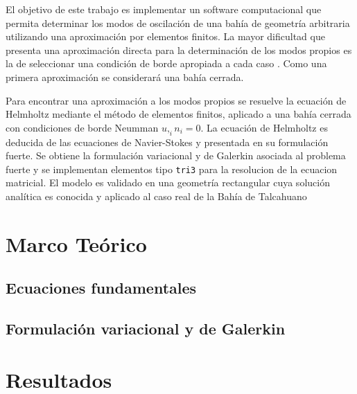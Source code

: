 \documentclass[12pt, letterpaper]{article}
\begin{document}
El objetivo de este trabajo es implementar un software computacional que permita determinar los modos de oscilaci\'on de una bah\'ia de geometr\'ia arbitraria utilizando una aproximaci\'on por elementos finitos. La mayor dificultad que presenta una aproximaci\'on directa para la determinaci\'on de los modos propios es la de seleccionar una condici\'on de borde apropiada a cada caso \cite{Mei2005, Rabino2009}. Como una primera aproximaci\'on se considerar\'a una bah\'ia cerrada.

Para encontrar una aproximaci\'on a los modos propios se resuelve la ecuaci\'on de Helmholtz mediante el m\'etodo de elementos finitos, aplicado a una bah\'ia cerrada con condiciones de borde Neumman $u,_i  n_i = 0$. La ecuaci\'on de Helmholtz es deducida de las ecuaciones de Navier-Stokes y presentada en su formulaci\'on fuerte. Se obtiene la formulaci\'on variacional y de Galerkin asociada al problema fuerte y se implementan elementos tipo \verb;tri3; para la resolucion de la ecuacion matricial. El modelo es validado en una geometr\'ia rectangular cuya soluci\'on anal\'itica es conocida y aplicado al caso real de la Bah\'ia de Talcahuano


\section{Marco Te\'orico}
  \subsection{Ecuaciones fundamentales}
  \label{subsec:ecuaciones}
  
  \subsection{Formulaci\'on variacional y de Galerkin}
  
\section{Resultados}
  
  
%   
\end{document}
